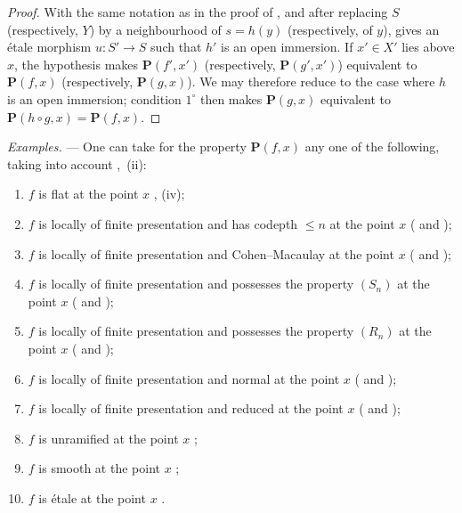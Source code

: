 \begin{proof}
With the same notation as in the proof of , and after replacing $S$ (respectively, $Y$) by a neighbourhood of $s=h(y)$ (respectively, of $y$),  gives an \'etale morphism $u:S'\to S$ such that $h'$ is an open immersion.
If $x'\in X'$ lies above $x$, the hypothesis makes $\boldsymbol{P}(f',x')$ (respectively, $\boldsymbol{P}(g',x')$) equivalent to $\boldsymbol{P}(f,x)$ (respectively, $\boldsymbol{P}(g,x)$).
We may therefore reduce to the case where $h$ is an open immersion; condition $1^\circ$ then makes $\boldsymbol{P}(g,x)$ equivalent to $\boldsymbol{P}(h\circ g,x)=\boldsymbol{P}(f,x)$.
\end{proof}

\begin{env}[18.4.11]
\label{IV.18.4.11}
\emph{Examples.} ---
One can take for the property $\boldsymbol{P}(f,x)$ any one of the following, taking into account ,~(ii):
\begin{enumerate}
  \item[(i)] $f$ is flat at the point $x$ , (iv);
  \item[(ii)] $f$ is locally of finite presentation and has codepth $\leq n$ at the point $x$ ( and );
  \item[(iii)] $f$ is locally of finite presentation and Cohen--Macaulay at the point $x$ ( and );
  \item[(iv)] $f$ is locally of finite presentation and possesses the property $(S_n)$ at the point $x$ ( and );
  \item[(v)] $f$ is locally of finite presentation and possesses the property $(R_n)$ at the point $x$ ( and );
  \item[(vi)] $f$ is locally of finite presentation and normal at the point $x$ ( and );
  \item[(vii)] $f$ is locally of finite presentation and reduced at the point $x$ ( and );
  \item[(viii)] $f$ is unramified at the point $x$ ;
  \item[(ix)] $f$ is smooth at the point $x$ ;
  \item[(x)] $f$ is \'etale at the point $x$ .
\end{enumerate}
\end{env}

